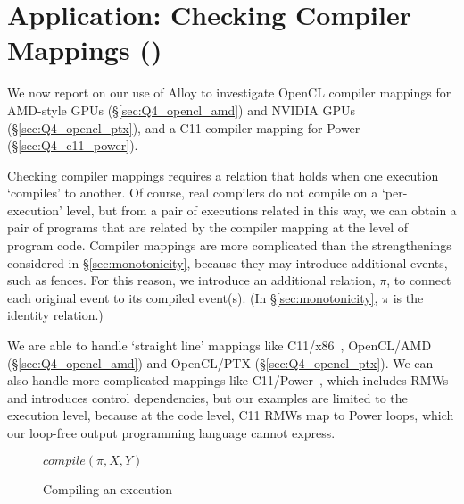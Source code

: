 \section{\!\!\!\!Application: Checking Compiler Mappings ()}
\label{sec:compilers}

We now report on our use of Alloy to investigate OpenCL
compiler mappings for AMD-style GPUs (\S\ref{sec:Q4_opencl_amd}) and
NVIDIA GPUs (\S\ref{sec:Q4_opencl_ptx}), and a C11 compiler mapping for
Power (\S\ref{sec:Q4_c11_power}).

Checking compiler mappings requires a relation that holds when one
execution `compiles' to another. Of course, real compilers do not
compile on a `per-execution' level, but from a pair of executions
related in this way, we can obtain a pair of programs that are related
by the compiler mapping at the level of program code. Compiler mappings are more complicated than the
strengthenings considered in \S\ref{sec:monotonicity}, because
they may introduce additional events, such as fences. For this
reason, we introduce an additional relation, $\pi$, to connect each
original event to its compiled event(s). (In \S\ref{sec:monotonicity},
$\pi$ is the identity relation.) 

We are able to handle `straight line' mappings like
C11/x86~\cite{batty+11}, OpenCL/AMD (\S\ref{sec:Q4_opencl_amd}) and
OpenCL/PTX (\S\ref{sec:Q4_opencl_ptx}). We can also handle more
complicated mappings like C11/Power~\cite{batty+12, sarkar+12}, which
includes RMWs and introduces control dependencies, but our examples
are limited to the execution level, because at the code level, C11
RMWs map to Power loops, which our loop-free output programming
language cannot express.


\begin{figure}[t]
\begin{myFrame}{$compile(\pi,X,Y)$}
\end{myFrame}
\caption{Compiling an execution}
\label{fig:compile}
\end{figure}

